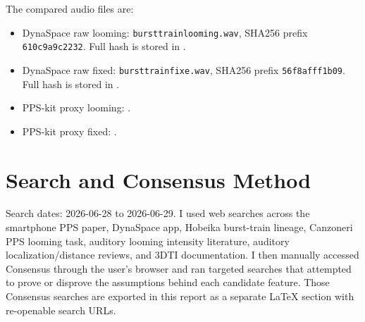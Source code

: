 \documentclass[10pt]{article}
\begin{document}
The compared audio files are:
\begin{itemize}
  \item DynaSpace raw looming: \texttt{bursttrainlooming.wav}, SHA256 prefix \texttt{610c9a9c2232}. Full hash is stored in .
  \item DynaSpace raw fixed: \texttt{bursttrainfixe.wav}, SHA256 prefix \texttt{56f8afff1b09}. Full hash is stored in .
  \item PPS-kit proxy looming: .
  \item PPS-kit proxy fixed: .
\end{itemize}

\section*{Search and Consensus Method}

Search dates: 2026-06-28 to 2026-06-29. I used web searches across the smartphone PPS paper, DynaSpace app, Hobeika burst-train lineage, Canzoneri PPS looming task, auditory looming intensity literature, auditory localization/distance reviews, and 3DTI documentation. I then manually accessed Consensus through the user's browser and ran targeted searches that attempted to prove or disprove the assumptions behind each candidate feature. Those Consensus searches are exported in this report as a separate LaTeX section with re-openable search URLs.
\end{document}
